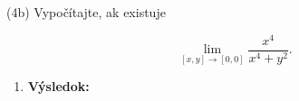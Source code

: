 \pr (4b) Vypočítajte, ak existuje

$$
\lim\limits_{
[x,y]\rightarrow [0,0]}
\frac{x^4}{x^4+y^2}.
$$

\begin{enumerate}

\item[]\textbf{Výsledok:}\gr

\end{enumerate}
